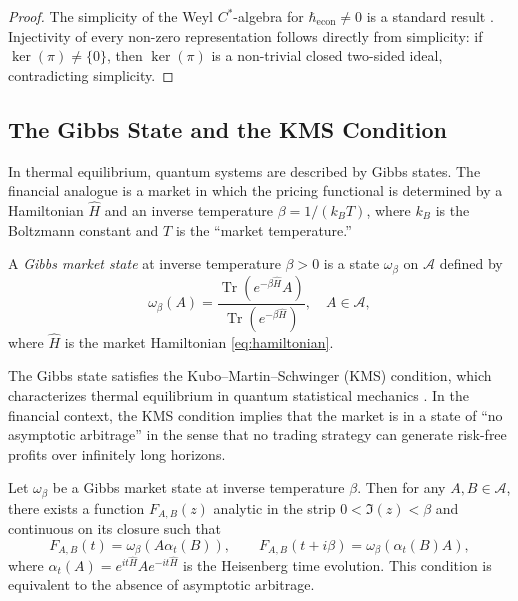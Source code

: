 \begin{proof}
The simplicity of the Weyl $C^*$-algebra for $\hbar_{\mathrm{econ}} \neq 0$
is a standard result \citep{petz1990algebra}. Injectivity of every non-zero
representation follows directly from simplicity: if
$\ker(\pi) \neq \{0\}$, then $\ker(\pi)$ is a non-trivial closed two-sided
ideal, contradicting simplicity.
\end{proof}

\subsection{The Gibbs State and the KMS Condition}

In thermal equilibrium, quantum systems are described by Gibbs states. The
financial analogue is a market in which the pricing functional is determined by a
Hamiltonian $\hat{H}$ and an inverse temperature $\beta = 1/(k_B T)$, where $k_B$
is the Boltzmann constant and $T$ is the ``market temperature.''

\begin{definition}\label{def:gibbs-state}
A \emph{Gibbs market state} at inverse temperature $\beta > 0$ is a state
$\omega_\beta$ on $\mathcal{A}$ defined by
\begin{equation*}
    \omega_\beta(A) = \frac{\operatorname{Tr}(e^{-\beta \hat{H}} A)}
        {\operatorname{Tr}(e^{-\beta \hat{H}})}, \quad A \in \mathcal{A},
\end{equation*}
where $\hat{H}$ is the market Hamiltonian \eqref{eq:hamiltonian}.
\end{definition}

The Gibbs state satisfies the Kubo--Martin--Schwinger (KMS) condition, which
characterizes thermal equilibrium in quantum statistical mechanics
\citep{kubo1957statistical,martin1959theory}. In the financial context, the KMS
condition implies that the market is in a state of ``no asymptotic arbitrage'' in
the sense that no trading strategy can generate risk-free profits over infinitely
long horizons.

\begin{theorem}\label{thm:kms}
Let $\omega_\beta$ be a Gibbs market state at inverse temperature $\beta$. Then for
any $A, B \in \mathcal{A}$, there exists a function $F_{A,B}(z)$ analytic in the
strip $0 < \Im(z) < \beta$ and continuous on its closure such that
\begin{equation*}
    F_{A,B}(t) = \omega_\beta(A \alpha_t(B)), \qquad
    F_{A,B}(t + i\beta) = \omega_\beta(\alpha_t(B) A),
\end{equation*}
where $\alpha_t(A) = e^{it\hat{H}} A e^{-it\hat{H}}$ is the Heisenberg time
evolution. This condition is equivalent to the absence of asymptotic arbitrage.
\end{theorem}

